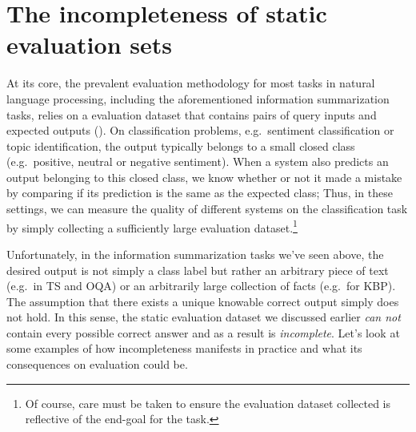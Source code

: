 \section{The incompleteness of static evaluation sets}
At its core, the prevalent evaluation methodology for most tasks in natural language processing, including the aforementioned information summarization tasks, relies on a evaluation dataset that contains pairs of query inputs and expected outputs ().
On classification problems, e.g.\ sentiment classification or topic identification, the output typically belongs to a small closed class (e.g.\ positive, neutral or negative sentiment).
When a system also predicts an output belonging to this closed class, we know whether or not it made a mistake by comparing if its prediction is the same as the expected class; 
Thus, in these settings, we can measure the quality of different systems on the classification task by simply collecting a sufficiently large evaluation dataset.\footnote{%
Of course, care must be taken to ensure the evaluation dataset collected is reflective of the end-goal for the task.}

Unfortunately, in the information summarization tasks we've seen above, the desired output is not simply a class label but rather an arbitrary piece of text (e.g.\ in TS and OQA) or an arbitrarily large collection of facts (e.g.\ for KBP).
The assumption that there exists a unique knowable correct output simply does not hold.
In this sense, the static evaluation dataset we discussed earlier \textit{can not} contain every possible correct answer and as a result is \textit{incomplete}.
Let's look at some examples of how incompleteness manifests in practice and what its consequences on evaluation could be.

